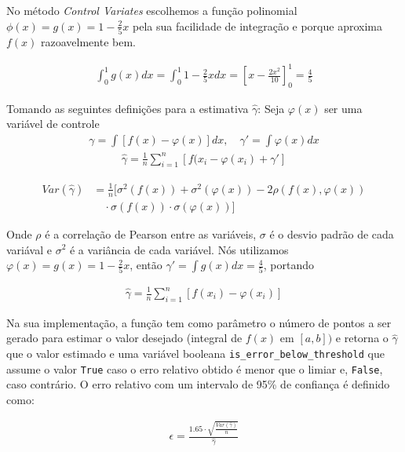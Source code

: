 \documentclass[twocolumn,amsmath,amssymb,floatfix]{revtex4}
\begin{document}
No método \textit{Control Variates} escolhemos a função polinomial $\phi(x) = g(x) = 1 - \frac{2}{5}x$ pela sua facilidade de integração e porque aproxima $f(x)$ razoavelmente bem.

\begin{eqnarray}
\int_{0}^{1}g(x)dx = \int_{0}^{1}1-\frac{2}{5}xdx = \left[ x-\frac{2x^{2}}{10} \right]_{0}^{1} = \frac{4}{5}
\end{eqnarray}

Tomando as seguintes definições para a estimativa $\hat{\gamma}$:
Seja $\varphi(x)$ ser uma variável de controle
\begin{eqnarray}
\gamma = \int\left[ f(x) - \varphi(x) \right]dx,\quad \gamma' = \int\varphi(x)dx
\end{eqnarray}
\begin{eqnarray}
\hat{\gamma} = \frac{1}{n}\sum_{i=1}^{n}\left[f(x_{i}-\varphi(x_{i}) + \gamma' \right]
\end{eqnarray}

\begin{align}
Var(\hat{\gamma}) & = \frac{1}{n}[\sigma^{2}(f(x))+\sigma^{2}(\varphi(x))-2\rho(f(x),\varphi(x))\nonumber \\
&  \quad \cdot \sigma(f(x))\cdot\sigma(\varphi(x))]
\end{align}

Onde $\rho$ é a correlação de Pearson entre as variáveis, $\sigma$ é o desvio padrão de cada variával e $\sigma^{2}$ é a variância de cada variável.
Nós utilizamos $\varphi(x)=g(x)=1-\frac{2}{5}x$, então $\gamma' = \int g(x)dx = \frac{4}{5}$, portando

\begin{eqnarray}
\hat{\gamma} = \frac{1}{n}\sum_{i=1}^{n}\left[ f(x_{i}) - \varphi(x_{i}) \right]
\end{eqnarray}

Na sua implementação, a função tem como parâmetro o número de pontos a ser gerado para estimar o valor desejado (integral de $f(x)$ em $[a,b])$ e retorna o $\hat{\gamma}$ que o valor estimado e uma variável booleana \verb|is_error_below_threshold| que assume o valor \verb|True| caso o erro relativo obtido é menor que o limiar e, \verb|False|, caso contrário. O erro relativo com um intervalo de 95\% de confiança é definido como:

\begin{eqnarray}
\epsilon = \frac{1.65\cdot\sqrt{\frac{Var(\hat{\gamma})}{n}}}{\hat{\gamma}}
\end{eqnarray}
\end{document}
